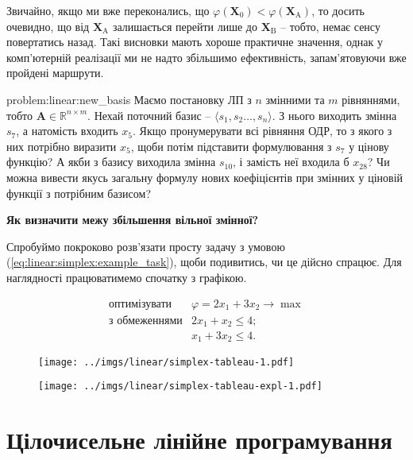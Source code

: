 \documentclass[\main/book.tex]{subfiles}
\begin{document}
\begin{note}
 Звичайно, якщо ми вже переконались, що ${\varphi(\mathbf{X}_0) < \varphi(\mathbf{X}_\mathrm{A})}$, то досить очевидно, що від $\mathbf{X}_\mathrm{A}$ залишається перейти лише до $\mathbf{X}_\mathrm{B}$ -- тобто, немає сенсу повертатись назад. Такі висновки мають хороше практичне значення, однак у комп'ютерній реалізації ми не надто збільшимо ефективність, запам'ятовуючи вже пройдені маршрути.
\end{note}

\begin{problem}{problem:linear:new_basis}
 Маємо постановку ЛП з $n$ змінними та $m$ рівняннями, тобто $\mathbf{A} \in \mathbb{R}^{n \times m}$. Нехай поточний базис -- $\langle s_1, s_2 \ldots, s_n \rangle$. З нього виходить змінна $s_7$, а натомість входить $x_5$. Якщо пронумерувати всі рівняння ОДР, то з якого з них потрібно виразити $x_5$, щоби потім підставити формулювання з $s_7$ у цінову функцію? А якби з базису виходила змінна $s_{10}$, і замість неї входила б $x_{28}$? Чи можна вивести якусь загальну формулу нових коефіцієнтів при змінних у ціновій функції з потрібним базисом?
\end{problem}

\textbf{Як визначити межу збільшення вільної змінної?} \quad

Спробуймо покроково розв'язати просту задачу з умовою (\ref{eq:linear:simplex:example_task}), щоби подивитись, чи це дійсно спрацює. Для наглядності працюватимемо спочатку з графікою.

\begin{equation}
 \begin{array}{rl}
  \text{оптимізувати}  & \varphi = 2 x_1 + 3 x_2 \rightarrow \max \\
  \text{з обмеженнями} & 2 x_1 +   x_2 \leq 4; \\
                       &   x_1 + 3 x_2 \leq 4.
 \end{array}
 \label{eq:linear:simplex:example_task}
\end{equation}

\begin{figure}
 \centering
 \texttt{[image: ../imgs/linear/simplex-tableau-1.pdf]}
\end{figure}

\begin{figure}
 \centering
 \texttt{[image: ../imgs/linear/simplex-tableau-expl-1.pdf]}
\end{figure}
\section{Цілочисельне лінійне програмування}
\label{section:linear:integer}
\end{document}
